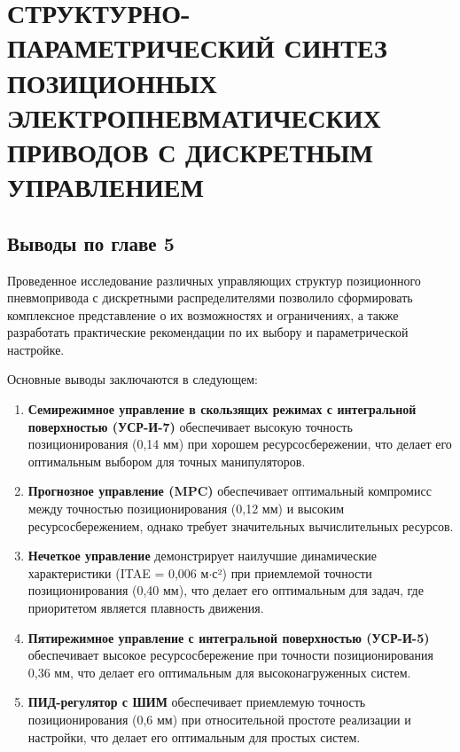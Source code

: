 \chapter{СТРУКТУРНО-ПАРАМЕТРИЧЕСКИЙ СИНТЕЗ ПОЗИЦИОННЫХ ЭЛЕКТРОПНЕВМАТИЧЕСКИХ ПРИВОДОВ С ДИСКРЕТНЫМ УПРАВЛЕНИЕМ}\label{ch:ch5}






\section{Выводы по главе 5}

Проведенное исследование различных управляющих структур позиционного пневмопривода
с дискретными распределителями позволило сформировать комплексное представление о их
возможностях и ограничениях, а также разработать практические рекомендации по их
выбору и параметрической настройке.

Основные выводы заключаются в следующем:

\begin{enumerate}
	\item \textbf{Семирежимное управление в скользящих режимах с интегральной поверхностью (УСР-И-7)}
	      обеспечивает высокую точность позиционирования (0,14 мм) при хорошем ресурсосбережении, что делает
	      его оптимальным выбором для точных манипуляторов.

	\item \textbf{Прогнозное управление (MPC)} обеспечивает оптимальный компромисс между точностью
	      позиционирования (0,12 мм) и высоким ресурсосбережением, однако требует значительных вычислительных ресурсов.

	\item \textbf{Нечеткое управление} демонстрирует наилучшие динамические характеристики
	      (ITAE = 0,006 м$\cdot$с²) при приемлемой точности позиционирования (0,40 мм), что делает
	      его оптимальным для задач, где приоритетом является плавность движения.

	\item \textbf{Пятирежимное управление с интегральной поверхностью (УСР-И-5)} обеспечивает
	      высокое ресурсосбережение при точности позиционирования 0,36 мм, что делает его оптимальным
	      для высоконагруженных систем.

	\item \textbf{ПИД-регулятор с ШИМ} обеспечивает приемлемую точность позиционирования (0,6 мм)
	      при относительной простоте реализации и настройки, что делает его оптимальным для простых систем.
\end{enumerate}

